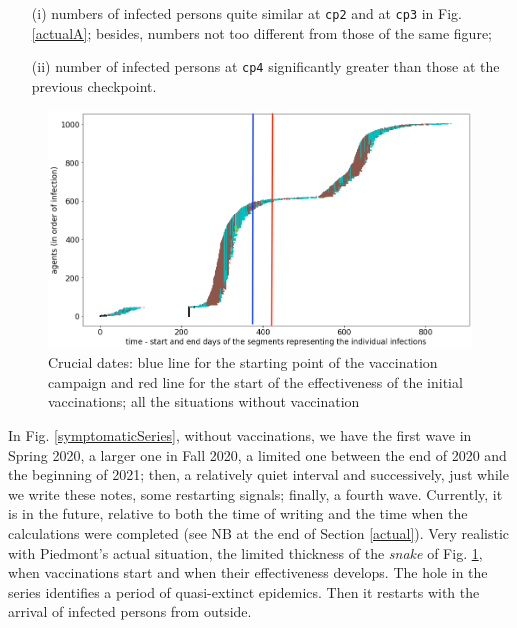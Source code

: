 \documentclass[graybox]{svmult}
\begin{document}
\begin{itemize}
\item [(i)] numbers of infected persons quite similar at \verb|cp2| and at \verb|cp3| in Fig. \ref{actualA}; besides, numbers not too different from those of the same figure;

\item [(ii)] number of infected persons at \verb|cp4| significantly greater than those at the previous checkpoint.
\end{itemize}

\begin{figure}[t]
\center
\includegraphics[scale=0.2]{CaseForGA_I_base.png}
\caption{Crucial dates: blue line for the starting point of the vaccination campaign and red line for the start of the effectiveness of the initial vaccinations; all the situations without vaccination}
\label{specificCaseGA}
\end{figure}

In Fig. \ref{symptomaticSeries}, without vaccinations, we have the first wave in Spring 2020, a larger one in Fall 2020, a limited one between the end of 2020 and the beginning of 2021; then, a relatively quiet interval and successively, just while we write these notes, some restarting signals; finally, a fourth wave. Currently, it is in the future, relative to both the time of writing and the time when the calculations were completed (see NB at the end of Section \ref{actual}). Very realistic with Piedmont's actual situation, the limited thickness of the \emph{snake} of Fig. \ref{specificCaseGA}, when vaccinations start and when their effectiveness develops. The hole in the series identifies a period of quasi-extinct epidemics. Then it restarts with the arrival of infected persons from outside.
\end{document}
